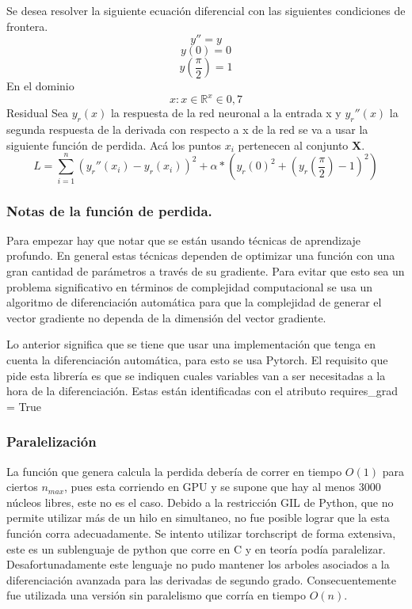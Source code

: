 \documentclass[11pt]{article}
\begin{document}
Se desea resolver la siguiente ecuación diferencial con las siguientes
condiciones de frontera. \[y'' = y\] \[y(0) = 0\]
\[y(\frac{\pi}{2}) = 1\] En el dominio
\[{x : x\in \mathbb{R} ^ x\in {0,7}}\] Residual Sea \(y_r(x)\) la
respuesta de la red neuronal a la entrada x y \(y_r''(x)\) la segunda
respuesta de la derivada con respecto a x de la red se va a usar la
siguiente función de perdida. Acá los puntos \(x_i\) pertenecen al
conjunto \(\mathbf{X}\).
\[L = \sum_{i=1}^n{(y_r''(x_i)-y_r(x_i))^2}+\alpha * (y_r(0)^2+(y_r(\frac{\pi}{2}) - 1)^2)\]

\hypertarget{notas-de-la-funciuxf3n-de-perdida.}{%
\subsubsection{Notas de la función de
perdida.}\label{notas-de-la-funciuxf3n-de-perdida.}}

Para empezar hay que notar que se están usando técnicas de aprendizaje
profundo. En general estas técnicas dependen de optimizar una función
con una gran cantidad de parámetros a través de su gradiente. Para
evitar que esto sea un problema significativo en términos de complejidad
computacional se usa un algoritmo de diferenciación automática para que
la complejidad de generar el vector gradiente no dependa de la dimensión
del vector gradiente.

Lo anterior significa que se tiene que usar una implementación que tenga
en cuenta la diferenciación automática, para esto se usa Pytorch. El
requisito que pide esta librería es que se indiquen cuales variables van
a ser necesitadas a la hora de la diferenciación. Estas están
identificadas con el atributo requires\_grad = True

\hypertarget{paralelizaciuxf3n}{%
\subsubsection{Paralelización}\label{paralelizaciuxf3n}}

La función que genera calcula la perdida debería de correr en tiempo
\(O(1)\) para ciertos \(n_{max}\), pues esta corriendo en GPU y se
supone que hay al menos 3000 núcleos libres, este no es el caso. Debido
a la restricción GIL de Python, que no permite utilizar más de un hilo
en simultaneo, no fue posible lograr que la esta función corra
adecuadamente. Se intento utilizar torchscript de forma extensiva, este
es un sublenguaje de python que corre en C y en teoría podía
paralelizar. Desafortunadamente este lenguaje no pudo mantener los
arboles asociados a la diferenciación avanzada para las derivadas de
segundo grado. Consecuentemente fue utilizada una versión sin
paralelismo que corría en tiempo \(O(n)\).
\end{document}
